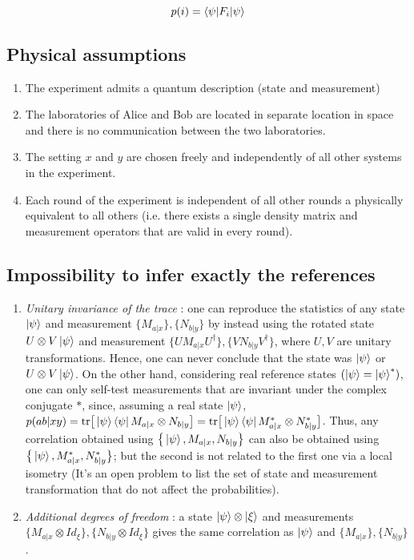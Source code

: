 \documentclass[12pt]{article}
\begin{document}
\begin{equation}
	p(i) = \braket{\psi | F_i | \psi}
\end{equation}

\subsection{Physical assumptions}

\begin{enumerate}
	\item The experiment admits a quantum description (state and measurement)
	\item The laboratories of Alice and Bob are located in separate location in
		space and there is no communication between the two laboratories.
	\item The setting $x$ and $y$ are chosen freely and independently of all
		other systems in the experiment.
	\item Each round of the experiment is independent of all other rounds a
		physically equivalent to all others (i.e. there exists a single density
		matrix and measurement operators that are valid in every round).
\end{enumerate}


\subsection{Impossibility to infer exactly the references}

\begin{enumerate}
	\item \textit{Unitary invariance of the trace} : one can reproduce the
		statistics of any state $\ket{\psi}$ and measurement $\{M_{a|x}\},
		\{N_{b|y}\}$ by instead using the rotated state $U \otimes V \ket{\psi}$
		and measurement $\{UM_{a|x}U^\dagger\}, \{VN_{b|y}V^\dagger\}$, where
		$U, V$ are unitary transformations. Hence, one can never conclude that
		the state was $\ket{\psi}$ or $U \otimes V \ket{\psi}$. \newline On the
		other hand, considering real reference states $(\ket{\psi} =
		\ket{\psi}^*)$, one can only self-test measurements that are invariant
		under the complex conjugate $*$, since, assuming a real state
		$\ket{\psi}$, $p(ab|xy) = \text{tr}\big[\ket{\psi}\bra{\psi} M_{a|x}
		\otimes N_{b|y} \big] = \text{tr}\big[\ket{\psi}\bra{\psi} M_{a|x}^*
		\otimes N_{b|y}^* \big]$. Thus, any correlation obtained using
		$\big\{\ket{\psi}, M_{a|x}, N_{b|y} \big\}$ can also be obtained using
		$\big\{\ket{\psi}, M_{a|x}^*, N_{b|y}^* \big\}$; but the second is not
		related to the first one via a local isometry (It's an open problem to
		list the set of state and measurement transformation that do not affect
		the probabilities).

	\item \textit{Additional degrees of freedom} : a state $\ket{\psi} \otimes
		\ket \xi$ and measurements $\{M_{a|x} \otimes Id_\xi\}, \{N_{b|y}
		\otimes Id_\xi\}$ gives the same correlation as $\ket{\psi}$ and
		$\{M_{a|x}\}, \{N_{b|y}\}$.
\end{enumerate}
\end{document}
